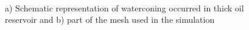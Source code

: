 \documentclass{eage19}
\begin{document}
\begin{figure}[h!]
	\begin{minipage}{0.54\linewidth}
	\end{minipage}
	\hfill
	\begin{minipage}{0.42\linewidth}
	\end{minipage}
	\caption{a)  Schematic representation of waterconing occurred in thick oil reservoir and b) part of the mesh used in the simulation}
	\label{scheme_wconning_mesh}\
\end{figure}
\end{document}

